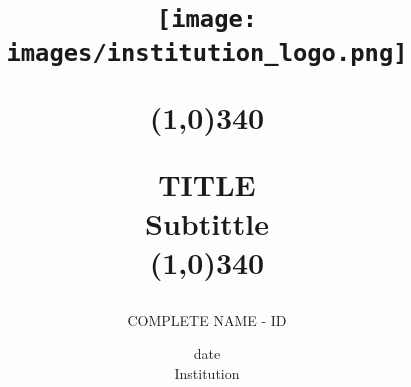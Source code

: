 \title{
	\begin{center}
	\vspace{3cm}
	\texttt{[image: images/institution\_logo.png]}
	\end{center}
	\begin{center}
	\line(1,0){340}
	\end{center}		
	TITLE\\
	\vspace{2mm}
	\Large Subtittle\\
	\line(1,0){340}
	\vspace{2.5cm}
	}

\author{COMPLETE NAME - ID \vspace{1cm}}


\date{date\vspace{0.5cm} \\Institution}
